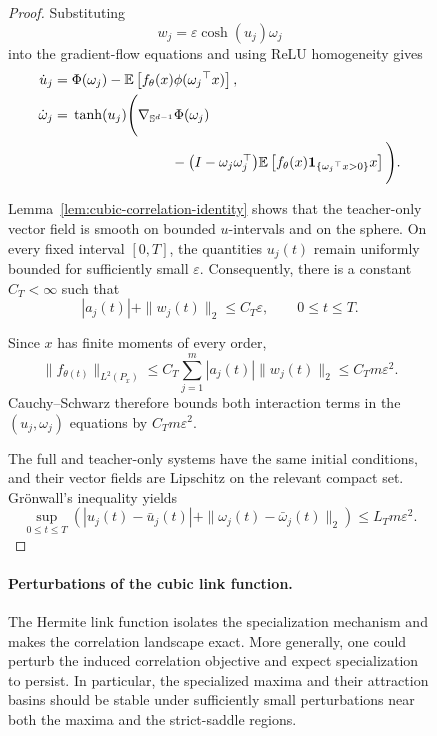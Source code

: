 \documentclass{article}
\begin{document}
\begin{figure}
\begin{proof}
Substituting
\[
    w_j
    =
    \varepsilon\cosh(u_j){\omega_j}
\]
into the gradient-flow equations and using ReLU homogeneity gives
\begin{align*}
    \dot u_j
    ={}&
    \Phi({\omega_j})
    -
    \mathbb E\left[
        f_\theta({x})
        \phi({\omega_j}^\top{x})
    \right],\\
    {\dot\omega_j}
    ={}&
    \tanh(u_j)
    \Bigg(
        \nabla_{\mathbb S^{d-1}}\Phi({\omega_j})\\
    &\hspace{25mm}
        -
        \bigl(I-{\omega_j\omega_j^\top}\bigr)
        \mathbb E\left[
            f_\theta({x})
            \mathbf 1_{\{{\omega_j}^\top
              {x}>0\}}{x}
        \right]
    \Bigg).
\end{align*}

Lemma~\ref{lem:cubic-correlation-identity} shows that the teacher-only
vector field is smooth on bounded $u$-intervals and on the sphere. On every
fixed interval $[0,T]$, the quantities $u_j(t)$ remain uniformly bounded for
sufficiently small $\varepsilon$. Consequently, there is a constant
$C_T<\infty$ such that
\[
    |a_j(t)|+\|w_j(t)\|_2
    \leq
    C_T\varepsilon,
    \qquad
    0\leq t\leq T.
\]

Since ${x}$ has finite moments of every order,
\[
    \|f_{\theta(t)}\|_{L^2(P_{{x}})}
    \leq
    C_T
    \sum_{j=1}^m
    |a_j(t)|\|w_j(t)\|_2
    \leq
    C_Tm\varepsilon^2.
\]
Cauchy--Schwarz therefore bounds both interaction terms in the
$(u_j,{\omega_j})$ equations by $C_Tm\varepsilon^2$.

The full and teacher-only systems have the same initial conditions, and
their vector fields are Lipschitz on the relevant compact set. Gr\"onwall's
inequality yields
\[
    \sup_{0\leq t\leq T}
    \left(
        |u_j(t)-\bar u_j(t)|
        +
        \|{\omega_j(t)-\bar\omega_j(t)}\|_2
    \right)
    \leq
    L_Tm\varepsilon^2.
\]
\end{proof}

\paragraph{Perturbations of the cubic link function.}
The Hermite link function isolates the specialization mechanism and makes the
correlation landscape exact. More generally, one could perturb the induced
correlation objective and expect specialization to persist.
In particular, the specialized maxima and their attraction basins should be
stable under sufficiently small perturbations near both the maxima and the
strict-saddle regions.





\end{figure}
\end{document}
